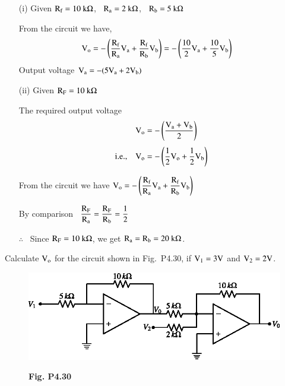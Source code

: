 \begin{solution}
\begin{itemize}
\item[(i)] Given $\textrm{R}_{\textrm{f}}=10~\textrm{k}\Omega$, \ $\textrm{R}_{\textrm{a}}=2~\textrm{k}\Omega$, \ $\textrm{R}_{\textrm{b}}=5~\textrm{k}\Omega$

From the circuit we have,
\begin{align*}
\textrm{V}_{\textrm{o}} &= -\left(\frac{\textrm{R}_{\textrm{f}}}{\textrm{R}_{\textrm{a}}}\textrm{V}_{\textrm{a}}+\frac{\textrm{R}_{\textrm{f}}}{\textrm{R}_{\textrm{b}}}\textrm{V}_{\textrm{b}}\right)
= -\left(\frac{10}{2}\textrm{V}_{\textrm{a}}+\frac{10}{5}\textrm{V}_{\textrm{b}}\right)
\end{align*}
Output voltage $\textrm{V}_{\textrm{a}}=-(5\textrm{V}_{\textrm{a}}+2\textrm{V}_{\textrm{b}})$

\item[(ii)] Given $\textrm{R}_{\textrm{F}}=10~\textrm{k}\Omega$

\smallskip
The required output voltage 
\begin{align*}
\textrm{V}_{\textrm{o}} &=-\left(\dfrac{\textrm{V}_{\textrm{a}}+\textrm{V}_{\textrm{b}}}{2}\right)\\[3pt]
\text{i.e.,}\quad \textrm{V}_{\textrm{o}} &=-\left(\frac{1}{2}\textrm{V}_{\textrm{o}}+\frac{1}{2}\textrm{V}_{\textrm{b}}\right)
\end{align*}

\vfill\eject

From the circuit we have $\textrm{V}_{\textrm{o}}=-\left(\dfrac{\textrm{R}_{\textrm{f}}}{\textrm{R}_{\textrm{a}}}\textrm{V}_{\textrm{a}}+\dfrac{\textrm{R}_{\textrm{f}}}{\textrm{R}_{\textrm{b}}}\textrm{V}_{\textrm{b}}\right)$

\medskip
By comparison \ $\dfrac{\textrm{R}_{\textrm{F}}}{\textrm{R}_{\textrm{a}}}=\dfrac{\textrm{R}_{\textrm{F}}}{\textrm{R}_{\textrm{b}}}=\dfrac{1}{2}$

\medskip
$\therefore$~ Since $\textrm{R}_{\textrm{F}}=10~\textrm{k}\Omega$, we get $\textrm{R}_{\textrm{a}}=\textrm{R}_{\textrm{b}}=20~\textrm{k}\Omega$.
\end{itemize}
\end{solution}

\begin{problem}\label{prob4.30}
Calculate $\textrm{V}_{\textrm{o}}$ for the circuit shown in Fig.~P4.30, if $\textrm{V}_{1}=3\textrm{V}$ and $\textrm{V}_{2}=2\textrm{V}$.
\begin{figure}[H]
\centering
\includegraphics{chap4/figP4.29.eps}

\smallskip
{\bf Fig. P4.30}
\end{figure}
\end{problem}

